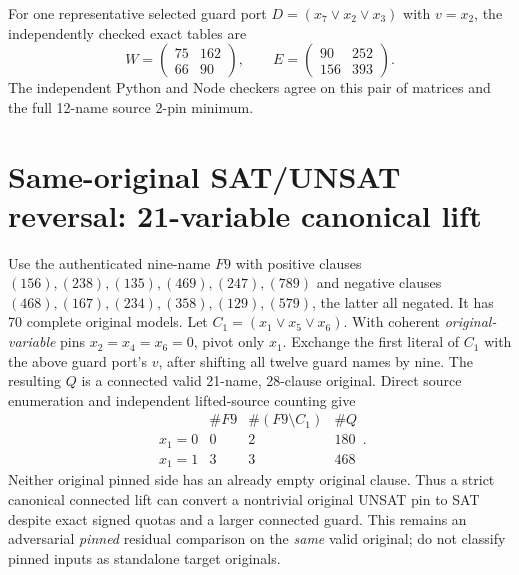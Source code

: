 \documentclass[11pt]{article}
\begin{document}
For one representative selected guard port $D=(x_7\vee x_2\vee x_3)$ with $v=x_2$, the independently checked exact tables are
\[
 W=\begin{pmatrix}75&162\\66&90\end{pmatrix},
 \qquad E=\begin{pmatrix}90&252\\156&393\end{pmatrix}.
\]
The independent Python and Node checkers agree on this pair of matrices and the full 12-name source 2-pin minimum.

\section{Same-original SAT/UNSAT reversal: 21-variable canonical lift}
Use the authenticated nine-name $F9$ with positive clauses $(156),(238),(135),(469),(247),(789)$ and negative clauses $(468),(167),(234),(358),(129),(579)$, the latter all negated. It has 70 complete original models. Let $C_1=(x_1\vee x_5\vee x_6)$. With coherent \emph{original-variable} pins $x_2=x_4=x_6=0$, pivot only $x_1$. Exchange the first literal of $C_1$ with the above guard port's $v$, after shifting all twelve guard names by nine. The resulting $Q$ is a connected valid 21-name, 28-clause original. Direct source enumeration and independent lifted-source counting give
\[
\begin{array}{c|rrr}
 &\#F9&\#(F9\setminus C_1)&\#Q\\\hline
 x_1=0&0&2&180\\
 x_1=1&3&3&468
\end{array}.
\]
Neither original pinned side has an already empty original clause. Thus a strict canonical connected lift can convert a nontrivial original UNSAT pin to SAT despite exact signed quotas and a larger connected guard. This remains an adversarial \emph{pinned} residual comparison on the \emph{same} valid original; do not classify pinned inputs as standalone target originals.
\end{document}
